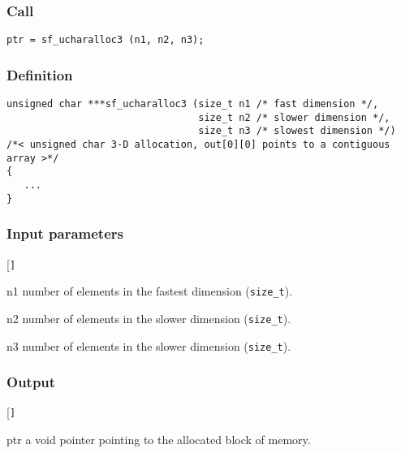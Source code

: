 \subsubsection*{Call}
\begin{verbatim}ptr = sf_ucharalloc3 (n1, n2, n3);\end{verbatim}

\subsubsection*{Definition}
\begin{verbatim}
unsigned char ***sf_ucharalloc3 (size_t n1 /* fast dimension */, 
                                 size_t n2 /* slower dimension */, 
                                 size_t n3 /* slowest dimension */)
/*< unsigned char 3-D allocation, out[0][0] points to a contiguous array >*/ 
{
   ...
}
\end{verbatim}

\subsubsection*{Input parameters}
\begin{desclist}{\tt }{\quad}[\tt ]
   \setlength\itemsep{0pt}
   \item[n1] number of elements in the fastest dimension (\texttt{size\_t}).
   \item[n2] number of elements in the slower dimension (\texttt{size\_t}).
   \item[n3] number of elements in the slower dimension (\texttt{size\_t}).
\end{desclist}

\subsubsection*{Output}
\begin{desclist}{\tt }{\quad}[\tt ]
   \setlength\itemsep{0pt}
   \item[ptr] a void pointer pointing to the allocated block of memory.
\end{desclist}




